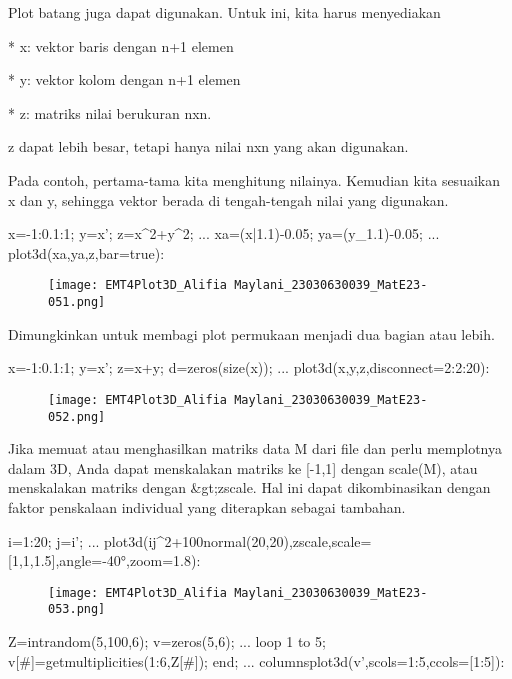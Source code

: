 \documentclass{article}
\begin{document}
Plot batang juga dapat digunakan. Untuk ini, kita harus menyediakan


* 
x: vektor baris dengan n+1 elemen

* 
y: vektor kolom dengan n+1 elemen

* 
z: matriks nilai berukuran nxn.


z dapat lebih besar, tetapi hanya nilai nxn yang akan digunakan.


Pada contoh, pertama-tama kita menghitung nilainya. Kemudian kita
sesuaikan x dan y, sehingga vektor berada di tengah-tengah nilai yang
digunakan.


\>x=-1:0.1:1; y=x'; z=x^2+y^2; ...  
\>   xa=(x|1.1)-0.05; ya=(y\_1.1)-0.05; ...  
\>   plot3d(xa,ya,z,bar=true):


\begin{figure}
    \centering
    \texttt{[image: EMT4Plot3D\_Alifia Maylani\_23030630039\_MatE23-051.png]}
    \caption{}
    \label{fig:enter-label}
\end{figure}

Dimungkinkan untuk membagi plot permukaan menjadi dua bagian atau
lebih.


\>x=-1:0.1:1; y=x'; z=x+y; d=zeros(size(x)); ...  
\>   plot3d(x,y,z,disconnect=2:2:20):


\begin{figure}
    \centering
    \texttt{[image: EMT4Plot3D\_Alifia Maylani\_23030630039\_MatE23-052.png]}
    \caption{}
    \label{fig:enter-label}
\end{figure}

Jika memuat atau menghasilkan matriks data M dari file dan perlu
memplotnya dalam 3D, Anda dapat menskalakan matriks ke [-1,1] dengan
scale(M), atau menskalakan matriks dengan &gt;zscale. Hal ini dapat
dikombinasikan dengan faktor penskalaan individual yang diterapkan
sebagai tambahan.


\>i=1:20; j=i'; ...  
\>   plot3d(i\*j^2+100\*normal(20,20),\>zscale,scale=[1,1,1.5],angle=-40°,zoom=1.8):


\begin{figure}
    \centering
    \texttt{[image: EMT4Plot3D\_Alifia Maylani\_23030630039\_MatE23-053.png]}
    \caption{}
    \label{fig:enter-label}
\end{figure}

\>Z=intrandom(5,100,6); v=zeros(5,6); ...  
\>   loop 1 to 5; v[#]=getmultiplicities(1:6,Z[#]); end; ...  
\>   columnsplot3d(v',scols=1:5,ccols=[1:5]):
\end{document}
